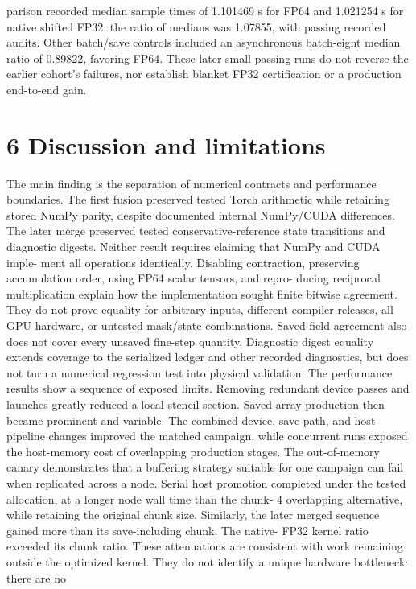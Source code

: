 \documentclass[11pt]{article}
\begin{document}
parison recorded median sample times of 1.101469 s for FP64 and 1.021254 s for native shifted
FP32: the ratio of medians was 1.07855, with passing recorded audits. Other batch/save controls
included an asynchronous batch-eight median ratio of 0.89822, favoring FP64. These later small
passing runs do not reverse the earlier cohort’s failures, nor establish blanket FP32 certification or
a production end-to-end gain.

\section*{6 Discussion and limitations}

The main finding is the separation of numerical contracts and performance boundaries. The first
fusion preserved tested Torch arithmetic while retaining stored NumPy parity, despite documented
internal NumPy/CUDA differences. The later merge preserved tested conservative-reference state
transitions and diagnostic digests. Neither result requires claiming that NumPy and CUDA imple-
ment all operations identically.
Disabling contraction, preserving accumulation order, using FP64 scalar tensors, and repro-
ducing reciprocal multiplication explain how the implementation sought finite bitwise agreement.
They do not prove equality for arbitrary inputs, different compiler releases, all GPU hardware,
or untested mask/state combinations. Saved-field agreement also does not cover every unsaved
fine-step quantity. Diagnostic digest equality extends coverage to the serialized ledger and other
recorded diagnostics, but does not turn a numerical regression test into physical validation.
The performance results show a sequence of exposed limits. Removing redundant device passes
and launches greatly reduced a local stencil section. Saved-array production then became prominent
and variable. The combined device, save-path, and host-pipeline changes improved the matched
campaign, while concurrent runs exposed the host-memory cost of overlapping production stages.
The out-of-memory canary demonstrates that a buffering strategy suitable for one campaign can
fail when replicated across a node. Serial host promotion completed under the tested allocation,
at a longer node wall time than the chunk- 4 overlapping alternative, while retaining the original
chunk size.
Similarly, the later merged sequence gained more than its save-including chunk. The native-
FP32 kernel ratio exceeded its chunk ratio. These attenuations are consistent with work remaining
outside the optimized kernel. They do not identify a unique hardware bottleneck: there are no
\end{document}
